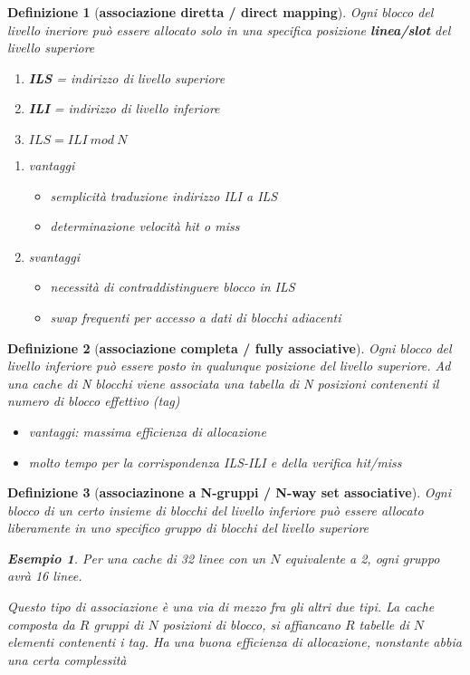 \documentclass[12pt, a4paper]{article}
\theoremstyle{break}
\newtheorem{defn}{Definizione}
\theoremstyle{lemma}
\theoremstyle{lemma}
\theoremstyle{lemma}
\newtheorem{esem}{Esempio}
\begin{document}
\begin{defn}[\textbf{associazione diretta / direct mapping}] 
Ogni blocco del livello ineriore può essere allocato solo in una specifica posizione  \textbf{linea/slot} del livello superiore
\begin{enumerate}
	\item \textbf{ILS} = indirizzo di livello superiore
	\item \textbf{ILI} = indirizzo di livello inferiore 
	\item $ILS = ILI\ mod\ N$
\end{enumerate}	

\begin{enumerate}
	\item vantaggi
		\begin{itemize}
			\item semplicità traduzione indirizzo ILI a ILS
			\item determinazione velocità hit o miss
		\end{itemize}
	\item svantaggi
		\begin{itemize}
			\item necessità di contraddistinguere blocco in ILS
			\item swap frequenti per accesso a dati di blocchi adiacenti		    \end{itemize}
\end{enumerate}
\end{defn}

\begin{defn}[\textbf{associazione completa / fully associative}] 
Ogni blocco del livello inferiore può essere posto in qualunque posizione del livello superiore. \newline
Ad una cache di N blocchi viene associata una tabella di N posizioni contenenti il numero di blocco effettivo (tag)
\begin{itemize}
	\item vantaggi: massima efficienza di allocazione
	\item molto tempo per la corrispondenza ILS-ILI e della verifica hit/miss
\end{itemize}
\end{defn}

\begin{defn}[\textbf{associazinone a N-gruppi / N-way set associative}] 
Ogni blocco di un certo insieme di blocchi del livello inferiore può essere allocato liberamente in uno specifico gruppo di blocchi del livello superiore

\begin{esem}
Per una cache di 32 linee con un $N$ equivalente a 2, ogni gruppo avrà 16 linee.
\end{esem}
Questo tipo di associazione è una via di mezzo fra gli altri due tipi. 
La cache composta da $R$ gruppi di $N$ posizioni di blocco, si affiancano $R$ tabelle di $N$ elementi contenenti i tag.
Ha una buona efficienza di allocazione, nonstante abbia una certa complessità
\end{defn}
\end{document}
